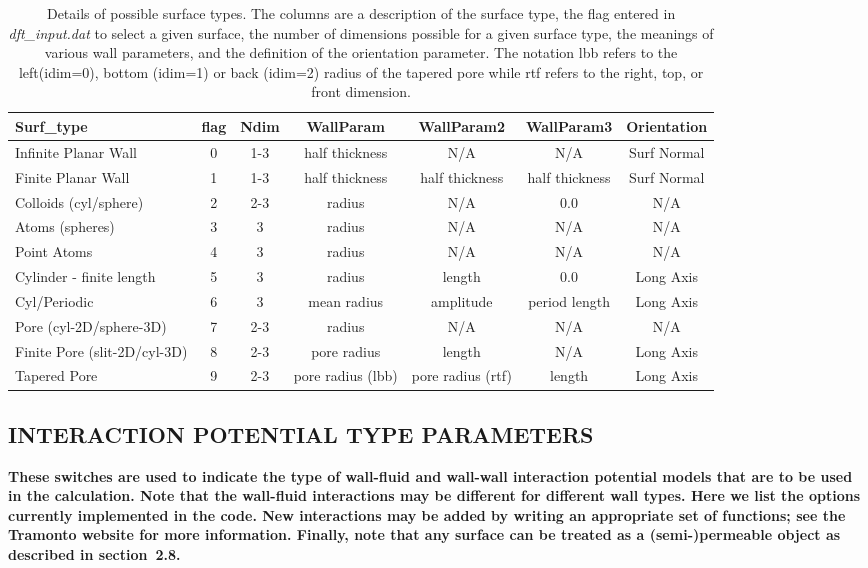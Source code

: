 \documentclass[10pt,onecolumn]{article}
\begin{document}
\begin{table}[h]
\begin{tabular}{|l|c|c|c|c|c|c|}
\hline
Surf\_type & flag& Ndim& WallParam & WallParam2 & WallParam3 & Orientation \\
\hline
Infinite Planar Wall & 0&1-3 & half thickness & N/A & N/A & Surf Normal \\
Finite Planar Wall & 1 &1-3 & half thickness & half thickness
& half thickness & Surf Normal\\
Colloids (cyl/sphere)& 2 &2-3& radius & N/A & 0.0 & N/A \\
Atoms (spheres)& 3 &3& radius & N/A & N/A & N/A \\
Point Atoms & 4 &3& radius & N/A & N/A & N/A \\
Cylinder - finite length& 5 &3& radius & length & 0.0 & Long Axis \\
Cyl/Periodic & 6 & 3& mean radius & amplitude & period length & Long Axis \\
Pore (cyl-2D/sphere-3D)& 7 & 2-3& radius & N/A & N/A & N/A\\
Finite Pore (slit-2D/cyl-3D)& 8 & 2-3& pore radius & length & N/A &Long Axis \\
Tapered Pore  & 9 & 2-3& pore radius (lbb)& pore radius (rtf)& length & Long Axis\\
\hline
\end{tabular}
\caption{Details of possible surface types. The columns are a
description of the surface type, the flag entered in {\it dft\_input.dat}
to select a given surface, the number of dimensions possible for a
given surface type, the meanings of various wall parameters,
and the definition of the orientation parameter. 
The notation lbb refers to the left(idim=0),
bottom (idim=1) or back (idim=2) radius of the tapered pore while
rtf refers to the right, top, or front dimension. \label{tab:table1} }
\end{table}



\vfill
\break

\subsection{INTERACTION POTENTIAL TYPE PARAMETERS}
{\bf
 These switches are used to indicate the type of wall-fluid and wall-wall interaction
 potential models that are to be used in the calculation.  Note that the wall-fluid interactions may
 be different for different wall types.  Here we list the options currently implemented in the code.  New interactions may be added by writing an appropriate set of functions; see the Tramonto website for more information.  Finally, note that any surface
 can be treated as a (semi-)permeable object as described in section~2.8.}
\end{document}
